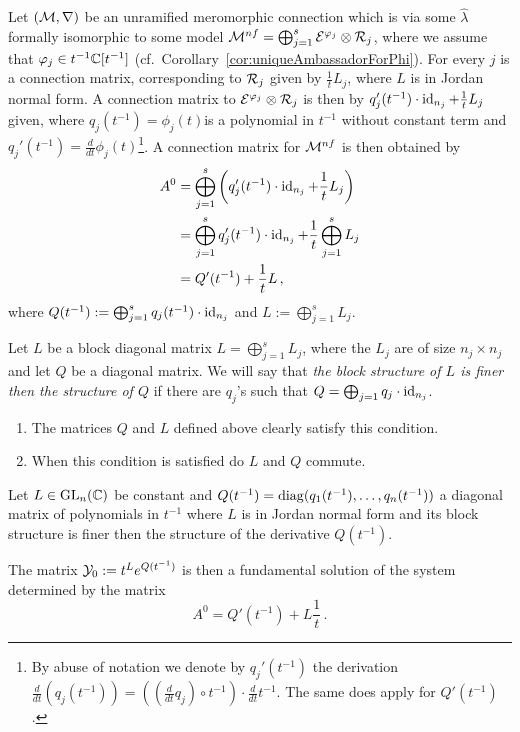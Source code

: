 Let $(\mathcal{M},\nabla)$ be an unramified meromorphic connection which is via some
$\hat\lambda$ formally isomorphic to some model
$\mathcal{M}^{nf}=\bigoplus_{j=1}^s\mathcal{E}^{\varphi_j}\otimes\mathcal{R}_j$, where we assume that
$\varphi_j\in t^{-1}\mathbb{C}[t^{-1}]$ (cf.~Corollary~\ref{cor:uniqueAmbassadorForPhi}).
For every $j$ is a connection matrix, corresponding to $\mathcal{R}_j$ given by
$\frac{1}{t}L_j$, where $L$ is in Jordan normal form.
A connection matrix to $\mathcal{E}^{\varphi_j}\otimes\mathcal{R}_j$ is then by
$q_j'(t^{-1})\cdot\operatorname{id}_{n_j}+\frac{1}{t}L_j$ given\TODO[(cf.~???)], where
$q_j(t^{-1})=\phi_j(t)$ is a polynomial in
$t^{-1}$ without constant term and
$q_j'(t^{-1})=\frac{d}{dt}\phi_j(t)$\footnote{By abuse of notation we denote by
  $q_j'(t^{-1})$ the derivation $\frac{d}{dt}(q_j(t^{-1}))=
  \left(\left(\frac{d}{dt}q_j\right)\circ t^{-1}\right) \cdot\frac{d}{dt}t^{-1}$.
  The same does apply for $Q'(t^{-1})$.}.
A connection matrix for $\mathcal{M}^{nf}$ is then obtained by
\begin{align*}
  A^0&= \bigoplus_{j=1}^s
       \left(q_j'(t^{-1})\cdot\operatorname{id}_{n_j}+\frac{1}{t}L_j\right)
  \\ &=\bigoplus_{j=1}^sq_j'(t^{-1})\cdot\operatorname{id}_{n_j}
       +\frac{1}{t}\bigoplus_{j=1}^sL_j
  \\ &=Q'(t^{-1})+\frac{1}{t}L \,,
\end{align*}
where
$Q(t^{-1}):=\bigoplus_{j=1}^sq_j(t^{-1})\cdot\operatorname{id}_{n_j}$
and $L:=\bigoplus_{j=1}^sL_j$.
\begin{defn}\label{defn:structureComparison}
  Let $L$ be a block diagonal matrix $L=\bigoplus_{j=1}^sL_j$, where the $L_j$
  are of size $n_j\times n_j$ and let $Q$ be a diagonal matrix.
  We will say that \emph{the block structure of $L$ is finer then the
  structure of $Q$} if there are $q_j$'s such that
  $Q=\bigoplus_{j=1}q_j\cdot\operatorname{id}_{n_j}$.
  \begin{s-rem}
    \begin{enumerate}\label{rem:structureComparison}
      \item The matrices $Q$ and $L$ defined above clearly satisfy this
        condition.
      \item When this condition is satisfied do $L$ and $Q$ commute.
    \end{enumerate}
  \end{s-rem}
\end{defn}
\begin{prop}\label{prop:fundSolBuilder}
  Let $L\in \operatorname{GL}_n(\mathbb{C})$ be constant and
  $Q(t^{-1})=\operatorname{diag}(q_1(t^{-1}),\dots,q_n(t^{-1}))$ a diagonal matrix of
  polynomials in $t^{-1}$ where $L$ is in Jordan normal form and its block
  structure is finer then the structure of the derivative $Q(t^{-1})$.

  The matrix $\mathcal{Y}_0:=t^L e^{Q(t^{-1})}$ is then a fundamental solution of the
  system determined by the matrix
  \[
    A^0=Q'(t^{-1})+L\frac{1}{t} \,.
  \]
\end{prop}
